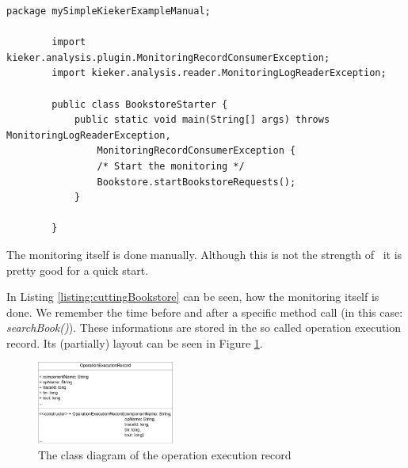       

	  \begin{lstlisting}[caption=BookstoreStarter.java]
		package mySimpleKiekerExampleManual;

		import kieker.analysis.plugin.MonitoringRecordConsumerException;
		import kieker.analysis.reader.MonitoringLogReaderException;

		public class BookstoreStarter {
			public static void main(String[] args) throws MonitoringLogReaderException,
				MonitoringRecordConsumerException {
				/* Start the monitoring */
				Bookstore.startBookstoreRequests();
			}

		}
	  \end{lstlisting}
	  
      

      
	  
      The monitoring itself is done manually. Although this is not the strength of \Kieker\ it is pretty good for a quick start.
	  
      
	  
      In Listing \ref{listing:cuttingBookstore} can be seen, how the monitoring itself is done. We remember the time before and after a specific method call (in this case: \textit{searchBook()}). These informations are stored in the so called operation execution record. Its (partially) layout can be seen in Figure \ref{image:operationexecutionrecordclassdiagram}.
	  
		\begin{figure}[H]
			\begin{center}
				\includegraphics[width=0.4\textwidth]{./images/OpExRecClassDiagram.pdf}
				\caption{The class diagram of the operation execution record}
				\label{image:operationexecutionrecordclassdiagram}
			\end{center}
		\end{figure}
	  
